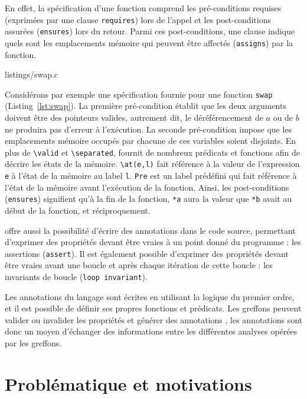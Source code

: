 En effet, la spécification d'une fonction comprend les pré-conditions requises
(exprimées par une clause \lstinline{requires}) lors de l'appel et les
post-conditions assurées (\lstinline{ensures}) lors du retour. Parmi ces
post-conditions, une clause indique quels sont les emplacements mémoire qui
peuvent être affectés (\lstinline{assigns}) par la fonction.


   {listings/swap.c}

Considérons par exemple une spécification fournie pour une fonction
\lstinline{swap}
(Listing~\ref{lst:swap}). La première pré-condition établit que les deux
arguments doivent être des pointeurs valides, autrement dit, le déréférencement
de $a$ ou de $b$ ne produira pas d'erreur à l'exécution. La seconde
pré-condition impose que les emplacements mémoire occupés par chacune de ces
variables soient disjoints. En plus de \lstinline{\valid} et
\lstinline{\separated}, \acsl fournit de nombreux prédicats et
fonctions afin de décrire les états de la mémoire. \lstinline{\at(e,l)}
fait référence à la valeur de l'expression \lstinline{e} à l'état de la mémoire
au label \lstinline{l}. \lstinline{Pre} est un label prédéfini qui fait
référence à l'état de la mémoire avant l'exécution de la fonction. Ainsi, les
post-conditions (\lstinline{ensures}) signifient qu'à la fin de la fonction,
\lstinline{*a} aura la valeur que \lstinline{*b} avait au
début de la fonction, et réciproquement.

\acsl offre aussi la possibilité d'écrire des annotations dans le code
source, permettant d'exprimer des propriétés devant être vraies à un point donné
du programme : les assertions (\lstinline{assert}).
Il est également possible d'exprimer des propriétés devant être vraies avant une
boucle et après chaque itération de cette boucle : les invariants de boucle
(\lstinline{loop invariant}).

Les annotations du langage \acsl sont écrites en utilisant la logique
du premier ordre, et il est possible de définir ses propres fonctions et
prédicats.
Les greffons peuvent valider ou invalider les propriétés \acsl et
générer des annotations \acsl, les annotations sont donc un moyen
d'échanger des informations entre les différentes analyses opérées par les
greffons.


\section{Problématique et motivations}
\label{sec:pb-motiv}


